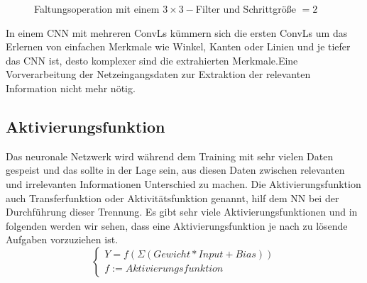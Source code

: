 \documentclass[12pt,a4paper]{scrartcl}
\numberwithin{equation}{section}
\begin{document}
\begin{figure}[h]
	
	\caption{Faltungsoperation mit einem $ 3\times 3 -$Filter und Schrittgröße $ =2 $}
	\label{Faltungsoperation2}
\end{figure}

In einem \ac{CNN} mit mehreren \acsp{ConvL} kümmern sich die ersten \acsp{ConvL} um das Erlernen von einfachen Merkmale wie Winkel, Kanten oder Linien und je tiefer das \ac{CNN} ist, desto komplexer sind die extrahierten Merkmale.Eine Vorverarbeitung der Netzeingangsdaten zur Extraktion der relevanten Information nicht mehr nötig. 



\subsection{Aktivierungsfunktion}
Das neuronale Netzwerk wird während dem Training mit sehr vielen Daten gespeist und das sollte in der Lage sein, aus diesen Daten zwischen relevanten und irrelevanten Informationen Unterschied zu machen.
Die Aktivierungsfunktion auch Transferfunktion oder Aktivitätsfunktion genannt, hilf dem \ac{NN} bei der Durchführung dieser Trennung. Es gibt sehr viele Aktivierungsfunktionen und in folgenden werden wir sehen, dass eine Aktivierungsfunktion je nach zu lösende Aufgaben  vorzuziehen ist.\[\begin{cases}
Y = f(\Sigma (Gewicht*Input + Bias))\\ f:= Aktivierungsfunktion
\end{cases} \]
\end{document}
